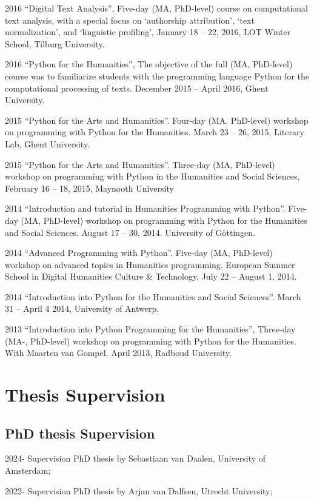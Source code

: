 \documentclass[12pt,letterpaper]{report}
\begin{document}
\begin{tablist}
  \item[2016] \tab{}``Digital Text Analysis'', Five-day (MA, PhD-level) course on
    computational text analysis, with a special focus on `authorship attribution', `text
    normalization', and `linguistic profiling', January 18 -- 22, 2016, LOT Winter School,
    Tilburg University.
  \item[2016] \tab{}``Python for the Humanities'', The objective of the full (MA,
    PhD-level) course was to familiarize students with the programming language Python for
    the computational processing of texts. December 2015 -- April 2016, Ghent University. 
  \item[2015] \tab{}``Python for the Arts and Humanities''. Four-day (MA, PhD-level)
    workshop on programming with Python for the Humanities. March 23 -- 26, 2015, Literary
    Lab, Ghent University.
  \item[2015] \tab{}``Python for the Arts and Humanities''. Three-day (MA, PhD-level)
    workshop on programming with Python in the Humanities and Social Sciences, February 16
    -- 18, 2015, Maynooth University
  \item[2014] \tab{}``Introduction and tutorial in Humanities Programming with Python''.
    Five-day (MA, PhD-level) workshop on programming with Python for the Humanities and
    Social Sciences. August 17 -- 30, 2014. University of Göttingen. 
  \item[2014] \tab{}``Advanced Programming with Python''. Five-day (MA, PhD-level)
    workshop on advanced topics in Humanities programming. European Summer School in
    Digital Humanities Culture \& Technology, July 22 -- August 1, 2014. 
  \item[2014] \tab{}``Introduction into Python for the Humanities and Social Sciences''.
    March 31 -- April 4 2014, University of Antwerp. 
  \item[2013] \tab{}``Introduction into Python Programming for the Humanities'', Three-day
    (MA-, PhD-level) workshop on programming with Python for the Humanities. With
    Maarten van Gompel. April 2013, Radboud University.
  \end{tablist}

  \section*{Thesis Supervision}
  \subsection*{PhD thesis Supervision}
\begin{tablist}
  \item[2024-] \tab{}Supervision PhD thesis by Sebastiaan van Daalen, University
    of Amsterdam;
  \item[2022-] \tab{}Supervision PhD thesis by Arjan van Dalfsen, Utrecht
    University;
\end{tablist}
\end{document}
